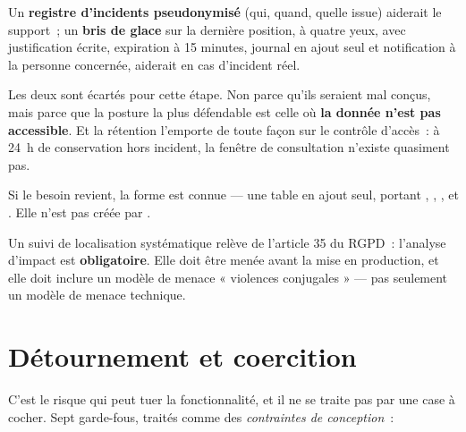 \begin{note}
Un \textbf{registre d'incidents pseudonymisé} (qui, quand, quelle issue) aiderait le
support~; un \textbf{bris de glace} sur la dernière position, à quatre yeux, avec
justification écrite, expiration à 15 minutes, journal en ajout seul et notification à la
personne concernée, aiderait en cas d'incident réel.

Les deux sont écartés pour cette étape. Non parce qu'ils seraient mal conçus, mais parce que
la posture la plus défendable est celle où \textbf{la donnée n'est pas accessible}. Et la
rétention l'emporte de toute façon sur le contrôle d'accès~: à 24~h de conservation hors
incident, la fenêtre de consultation n'existe quasiment pas.

Si le besoin revient, la forme est connue --- une table  en ajout
seul, portant , , ,  et
. Elle n'est pas créée par .
\end{note}

\begin{alerte}
Un suivi de localisation systématique relève de l'article 35 du RGPD~: l'analyse d'impact
est \textbf{obligatoire}. Elle doit être menée avant la mise en production, et elle doit
inclure un modèle de menace « violences conjugales » --- pas seulement un modèle de menace
technique.
\end{alerte}

\section{Détournement et coercition}

C'est le risque qui peut tuer la fonctionnalité, et il ne se traite pas par une case à
cocher. Sept garde-fous, traités comme des \emph{contraintes de conception}~:

